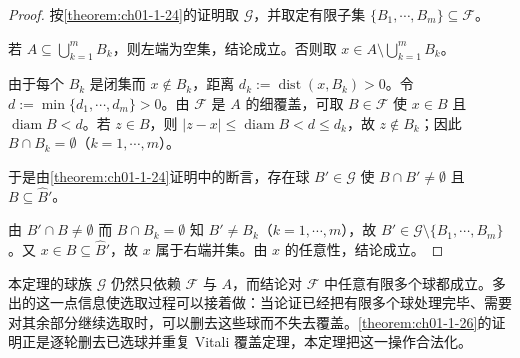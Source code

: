 \documentclass[../../main.tex]{subfiles}%
\begin{document}
\begin{proof}
按\cref{theorem:ch01-1-24}的证明取 $\mathcal{G}$，并取定有限子集 $\{B_1,\cdots,B_m\}\subseteq\mathcal{F}$。%

若 $A\subseteq\bigcup_{k=1}^{m}B_k$，则左端为空集，结论成立。否则取 $x\in A\setminus\bigcup_{k=1}^{m}B_k$。

由于每个 $B_k$ 是闭集而 $x\notin B_k$，距离 $d_k:=\operatorname{dist}(x,B_k)>0$。令 $d:=\min\{d_1,\cdots,d_m\}>0$。由 $\mathcal{F}$ 是 $A$ 的细覆盖，可取 $B\in\mathcal{F}$ 使 $x\in B$ 且 $\operatorname{diam}B<d$。若 $z\in B$，则 $\lvert z-x\rvert\leqslant\operatorname{diam}B<d\leqslant d_k$，故 $z\notin B_k$；因此 $B\cap B_k=\emptyset$（$k=1,\cdots,m$）。

于是由\cref{theorem:ch01-1-24}证明中的断言，存在球 $B'\in\mathcal{G}$ 使 $B\cap B'\neq\emptyset$ 且 $B\subseteq\hat B'$。%

由 $B'\cap B\neq\emptyset$ 而 $B\cap B_k=\emptyset$ 知 $B'\neq B_k$（$k=1,\cdots,m$），故 $B'\in\mathcal{G}\setminus\{B_1,\cdots,B_m\}$。又 $x\in B\subseteq\hat B'$，故 $x$ 属于右端并集。由 $x$ 的任意性，结论成立。
\end{proof}

\begin{remark}\label{remark:ch01-thm-1-25-动机}
本定理的球族 $\mathcal{G}$ 仍然只依赖 $\mathcal{F}$ 与 $A$，而结论对 $\mathcal{F}$ 中任意有限多个球都成立。多出的这一点信息使选取过程可以接着做：当论证已经把有限多个球处理完毕、需要对其余部分继续选取时，可以删去这些球而不失去覆盖。\cref{theorem:ch01-1-26}的证明正是逐轮删去已选球并重复 Vitali 覆盖定理，本定理把这一操作合法化。%
\end{remark}
\end{document}
